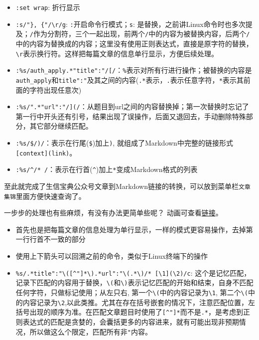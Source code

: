 \documentclass[]{article}
\providecommand{\tightlist}{%
  \setlength{\itemsep}{0pt}\setlength{\parskip}{0pt}}
\numberwithin{figure}{section}
\numberwithin{table}{section}
\begin{document}
\begin{itemize}
\tightlist
\item
  \texttt{:set\ wrap}: 折行显示
\item
  \texttt{:s/"\},\ \{"/\textbackslash{}r/g}: \texttt{:}开启命令行模式；\texttt{s}: 是替换，之前讲Linux命令时也多次提及；\texttt{/}作为分割符，三个一起出现，前两个\texttt{/}中的内容为被替换内容，后两个\texttt{/}中的内容为替换成的内容；这里没有使用正则表达式，直接是原字符的替换，\texttt{\textbackslash{}r}表示换行符。这样把每篇文章的信息单行显示，方便后续处理。
\item
  \texttt{:\%s/auth\_apply.*"title":"/{[}/}：\texttt{\%}表示对所有行进行操作；被替换的内容是\texttt{auth\_apply}和\texttt{title":"}及其之间的内容(\texttt{.*}表示，\texttt{.}表示任意字符，\texttt{*}表示其前面的字符出现任意次)
\item
  \texttt{:\%s/".*"url":"/{]}(/}：从题目到url之间的内容替换掉；第一次替换时忘记了第一行中开头还有引号，结果出现了误操作，后面又退回去，手动删除特殊部分，其它部分继续匹配。
\item
  \texttt{:\%s/\$/)/}：表示在行尾(\texttt{\$})加上\texttt{)}, 就组成了Markdown中完整的链接形式\texttt{{[}context{]}(link)}。
\item
  \texttt{:\%s/\^{}/*\ /}：表示在行首(\texttt{\^{}})加上\texttt{*}变成Markdown格式的列表
\end{itemize}

至此就完成了生信宝典公众号文章到Markdown链接的转换，可以放到菜单栏\texttt{文章集锦}里面方便快速查询了。

一步步的处理也有些麻烦，有没有办法更简单些呢？ 动画可查看\href{http://blog.genesino.com/images/vim/vim_bregexpr_record.gif}{链接}。

\begin{itemize}
\tightlist
\item
  首先也是把每篇文章的信息处理为单行显示，一样的模式更容易操作，去掉第一行行首不一致的部分
\item
  使用上下箭头可以回溯之前的命令，类似于Linux终端下的操作
\item
  \texttt{\%s/.*title":"\textbackslash{}({[}\^{}"{]}*\textbackslash{}).*url":"\textbackslash{}(.*\textbackslash{})/*\ {[}\textbackslash{}1{]}(\textbackslash{}2)/c}: 这个是记忆匹配，记录下匹配的内容用于替换，\texttt{\textbackslash{}(}和\texttt{\textbackslash{})}表示记忆匹配的开始和结束，自身不匹配任何字符，只做标记使用；从左只右, 第一个\texttt{\textbackslash{}(}中的内容记录为\texttt{\textbackslash{}1}, 第二个\texttt{\textbackslash{}(}中的内容记录为\texttt{\textbackslash{}2},以此类推。尤其在存在括号嵌套的情况下，注意匹配位置，左括号出现的顺序为准。在匹配文章题目时使用了\texttt{{[}\^{}"{]}*}而不是\texttt{.*}，是考虑到正则表达式的匹配是贪婪的，会囊括更多的内容进来，就有可能出现非预期情况，所以做这么个限定，匹配所有非\texttt{"}内容。
\end{itemize}
\end{document}
